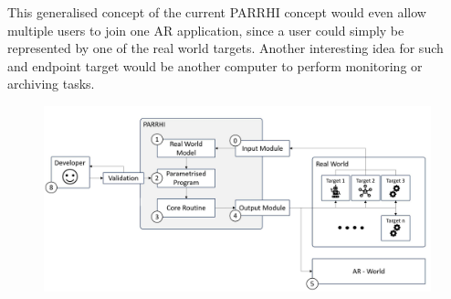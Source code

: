 This generalised concept of the current PARRHI concept would even allow multiple users to join one AR application, since a user could simply be represented by one of the real world targets. Another interesting idea for such and endpoint target would be another computer to perform monitoring or archiving tasks.


\begin{figure}[!h]
	\centering
	\includegraphics[width=0.8\linewidth]{Figures/FutureWork_ConceptV2}
	\caption[Future Work - Generalised Concept]{}
	\label{Fig:GeneralisedConcept}
\end{figure}













